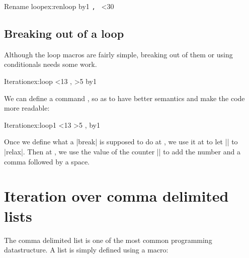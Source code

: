\begin{texexample}{Rename loop}{ex:renloop}
\bgroup
\def\for#1\endfor{\def\body{#1}\iterate}
\def\iterate{\body\let\next=\iterate\else\let\next=\relax\fi\next}
\newcount\n
{}
\for
   \advance\n by1
     \texttt{\number\n, }  
   \ifnum\n<30
\endfor
\egroup
\end{texexample}  


\subsection{Breaking out of a loop}

Although the loop macros are fairly simple, breaking out of them or using conditionals needs some work.

\begin{texexample}{Iteration}{ex:loop}
\newcount\mycount
{}
\loop\ifnum\mycount<13
\the\mycount, 
\ifnum\mycount>5
    \let\iterate\relax
 \fi
 \advance\mycount by1\relax
\repeat
\end{texexample}

We can define a command , so as to have better semantics and make the code more readable:


\begin{texexample}{Iteration}{ex:loop1}
\def\break{\let\iterate\relax}%
\newcount\mycount
{}
\loop
  \ifnum\mycount<13 %
    \ifnum\mycount>5
    \break %
   \fi
   \the\mycount,\space%
   \advance\mycount by1\relax
\repeat
\end{texexample}


Once we define what a |break| is supposed to do at , we use it at  to let |\iterate| to |relax|. Then at , we use the value of the counter |\the\mycount| to add the number and a comma followed by a space. 


\section{Iteration over comma delimited lists}

The comma delimited list is one of the most common programming datastructure. A list is simply defined using a macro:

